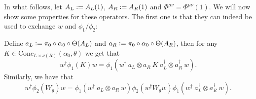 \documentclass[11pt,a4paper,twoside]{article}
\numberwithin{equation}{section}
\begin{document}
	In what follows, let $A_L\vcentcolon= A_L(1)$, $A_R\vcentcolon= A_R(1)$ and $\Phi^{\mu\nu}=\Phi^{\mu\nu}(1)$. We will now show some properties for these operators. The first one is that they can indeed be used to exchange $w$ and $\phi_1/\phi_2$:
	\begin{lemma}\label{lem:TranslationOutOfPhi_KW}
		Define $a_L\vcentcolon= \pi_0\circ\alpha_0\circ\Theta(A_L)$ and $a_R\vcentcolon= \pi_0\circ\alpha_0\circ\Theta(A_R)$, then for any $K\in\text{Cone}_{L\times\nu(R)}(\alpha_0,\theta)$ we get that
		\begin{equation}\label{eq:TranslationOutOfPhi_K}
			w^\dagger \phi_1(K)w=\phi_1(w^\dagger \: a_L\otimes a_R \: K \: a_L^\dagger\otimes a_R^\dagger \: w).
		\end{equation}
		Similarly, we have that
		\begin{equation}\label{eq:TranslationOutOfPhi_W}
			w^\dagger \phi_2(W_g)w=\phi_1(w^\dagger \: a_L\otimes a_R \: w)\phi_2(w^\dagger W_g w)\phi_1(w^\dagger \: a_L^\dagger\otimes a_R^\dagger \: w).
		\end{equation}
	\end{lemma}
\end{document}
